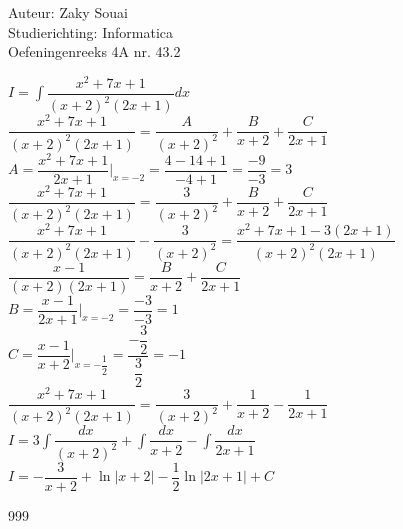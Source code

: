 \documentclass[a4paper]{article}
\begin{document}
  
\noindent \large Auteur: Zaky Souai \\
\noindent \large Studierichting:  Informatica\\
\noindent \large Oefeningenreeks 4A nr. 43.2\\

\bigskip

\normalsize

$\displaystyle I=\int \dfrac{x^2+7x+1}{(x+2)^2(2x+1)} dx$\\

$\displaystyle \dfrac{x^2+7x+1}{(x+2)^2(2x+1)}=\dfrac{A}{(x+2)^2}+\dfrac{B}{x+2}+\dfrac{C}{2x+1}$\\

$\displaystyle A=\dfrac{x^2+7x+1}{2x+1}|_{x=-2}=\dfrac{4-14+1}{-4+1}=\dfrac{-9}{-3}=3$\\

$\displaystyle \dfrac{x^2+7x+1}{(x+2)^2(2x+1)}=\dfrac{3}{(x+2)^2}+\dfrac{B}{x+2}+\dfrac{C}{2x+1}$\\

$\displaystyle \dfrac{x^2+7x+1}{(x+2)^2(2x+1)}-\dfrac{3}{(x+2)^2}=\dfrac{x^2+7x+1-3(2x+1)}{(x+2)^2(2x+1)}$\\

$\displaystyle \dfrac{x-1}{(x+2)(2x+1)}=\dfrac{B}{x+2}+\dfrac{C}{2x+1}$\\

$\displaystyle B=\dfrac{x-1}{2x+1}|_{x=-2}=\dfrac{-3}{-3}=1$\\

$\displaystyle C=\dfrac{x-1}{x+2}|_{x=-\dfrac{1}{2}}=\dfrac{-\dfrac{3}{2}}{\dfrac{3}{2}}=-1$\\

$\displaystyle \dfrac{x^2+7x+1}{(x+2)^2(2x+1)}=\dfrac{3}{(x+2)^2}+\dfrac{1}{x+2}-\dfrac{1}{2x+1}$\\

$\displaystyle I=3\int\dfrac{dx}{(x+2)^2}+\int\dfrac{dx}{x+2}-\int\dfrac{dx}{2x+1}$\\

$\displaystyle I=-\dfrac{3}{x+2}+\ln|x+2|-\dfrac12\ln|2x+1|+ C$


\begin{thebibliography}{999}
\end{thebibliography}
\end{document}
